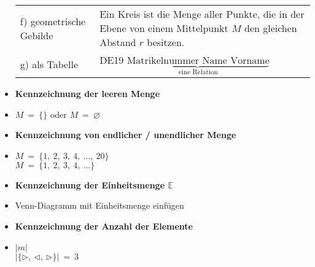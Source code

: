 \begin{itemize}[leftmargin=*]
\begin{tabular}{@{}l p{9cm}}
                            f) geometrische Gebilde         & Ein Kreis ist die Menge aller Punkte, die in der Ebene von einem Mittelpunkt $M$ den gleichen Abstand $r$ besitzen.\\
                            g) als Tabelle                  & DE19 \quad $\underbrace{\text{Matrikelnummer \ Name \ Vorname}}_{\text{eine Relation}}$ \\
                            \end{tabular}
                        \item \textbf{Kennzeichnung der leeren Menge}
                        \item[] $M \ = \ \{\}$ oder $M \ = \ \varnothing$
                        \item \textbf{Kennzeichnung von endlicher / unendlicher Menge}
                        \item[] $ M \ = \ \{ 1,\ 2,\ 3, \ 4, \ \ldots, \ 20\} $ \\
                                $ M \ = \ \{ 1,\ 2,\ 3, \ 4, \ \ldots \} $
                        \item \textbf{Kennzeichnung der Einheitsmenge $\mathbb{E}$}
                        \item[] Venn-Diagramm mit Einheitsmenge einfügen
                        \item \textbf{Kennzeichnung der Anzahl der Elemente}
                        \item[] $|m| $ \\ $|\{\rhd,\ \triangleleft,\ \triangleright \}| \ = \ 3$
                    \end{itemize}
